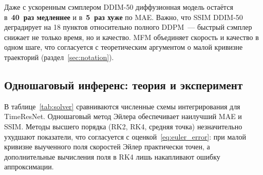 Даже с ускоренным сэмплером DDIM-50 диффузионная модель остаётся в~\textbf{40~раз медленнее} и в~\textbf{5~раз хуже} по MAE. Важно, что SSIM DDIM-50 деградирует на 18 пунктов относительно полного DDPM~--- быстрый сэмплер снижает не только время, но и качество. MFM объединяет скорость и качество в одном шаге, что согласуется с теоретическим аргументом о малой кривизне траекторий (раздел~\ref{sec:notation}).

\subsection{Одношаговый инференс: теория и эксперимент}
\label{sec:solver_ablation}

В таблице~\ref{tab:solver} сравниваются численные схемы интегрирования для TimeResNet. Одношаговый метод Эйлера обеспечивает наилучший MAE и SSIM. Методы высшего порядка (RK2, RK4, средняя точка) незначительно ухудшают показатели, что согласуется с оценкой~\eqref{eq:euler_error}: при малой кривизне выученного поля скоростей Эйлер практически точен, а дополнительные вычисления поля в RK4 лишь накапливают ошибку аппроксимации.

\begin{table}[htbp]
\centering
\caption{Анализ вклада компонент: численные методы интегрирования ОДУ для MFM (контрастное $\to$ нативное). \emph{Вычисл.}~= число обращений к сети.}
\label{tab:solver}
\end{table}


